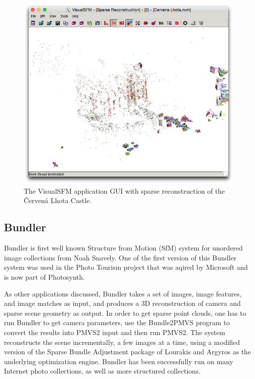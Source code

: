 \begin{figure}[ht]
	\begin{center}
		\includegraphics[keepaspectratio,width=\textwidth]{fig/VisualSFM.png}
	\end{center}
	\caption{The VisualSFM application GUI with sparse reconstruction of the Červená Lhota Castle.}
	\label{fig:visualsfm}
\end{figure}

\subsection*{Bundler}
Bundler is first well known Structure from Motion (SfM) system for unordered image collections from Noah Snavely. One of the first version of this Bundler system was used in the Photo Tourism project that was aqired by Microsoft and is now part of Photosynth. 

As other applications discussed, Bundler takes a set of images, image features, and image matches as input, and produces a 3D reconstruction of camera and sparse scene geometry as output. In order to get sparse point clouds, one has to run Bundler to get camera parameters, use the Bundle2PMVS program to convert the results into PMVS2 input and then run PMVS2. The system reconstructs the scene incrementally, a few images at a time, using a modified version of the Sparse Bundle Adjustment package of Lourakis and Argyros as the underlying optimization engine. Bundler has been successfully run on many Internet photo collections, as well as more structured collections. \cite{www:bundler}

